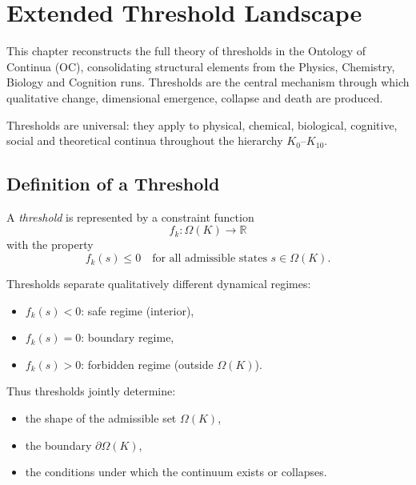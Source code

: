 
\section{Extended Threshold Landscape}
\label{sec:thresholds-extended}

This chapter reconstructs the full theory of thresholds in the Ontology of
Continua (OC), consolidating structural elements from the Physics, Chemistry,
Biology and Cognition runs. Thresholds are the central mechanism through which
qualitative change, dimensional emergence, collapse and death are produced.

Thresholds are universal: they apply to physical, chemical, biological,
cognitive, social and theoretical continua throughout the hierarchy
\(K_0\)–\(K_{10}\).

\subsection{Definition of a Threshold}

A \emph{threshold} is represented by a constraint function
\[
   f_k : \Omega(K) \rightarrow \mathbb{R}
\]
with the property
\[
   f_k(s) \le 0
   \quad\text{for all admissible states } s\in\Omega(K).
\]

Thresholds separate qualitatively different dynamical regimes:
\begin{itemize}
    \item \( f_k(s) < 0 \): safe regime (interior),
    \item \( f_k(s) = 0 \): boundary regime,
    \item \( f_k(s) > 0 \): forbidden regime (outside \(\Omega(K)\)).
\end{itemize}

Thus thresholds jointly determine:
\begin{itemize}
    \item the shape of the admissible set \(\Omega(K)\),
    \item the boundary \(\partial\Omega(K)\),
    \item the conditions under which the continuum exists or collapses.
\end{itemize}

